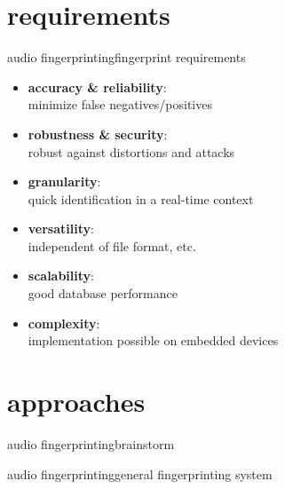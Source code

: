     \section[requirements]{requirements}
        \begin{frame}{audio fingerprinting}{fingerprint requirements}
            \begin{itemize}%
                \item	\textbf{accuracy \& reliability}:\\ minimize false negatives/positives
                \item<2->	\textbf{robustness \& security}: \\ robust against distortions and attacks
                \item<3->	\textbf{granularity}:\\ quick identification in a real-time context
                \item<4->	\textbf{versatility}:\\ independent of file format, etc.
                \item<5->	\textbf{scalability}:\\ good database performance
                \item<6->	\textbf{complexity}:\\ implementation possible on embedded devices
            \end{itemize}
        \end{frame}
        
    \section[approaches]{approaches}
        \begin{frame}{audio fingerprinting}{brainstorm}
        \end{frame}
        
        \begin{frame}{audio fingerprinting}{general fingerprinting system}
            \begin{figure}
                \centering
                	
            \end{figure}
        \end{frame}
        
